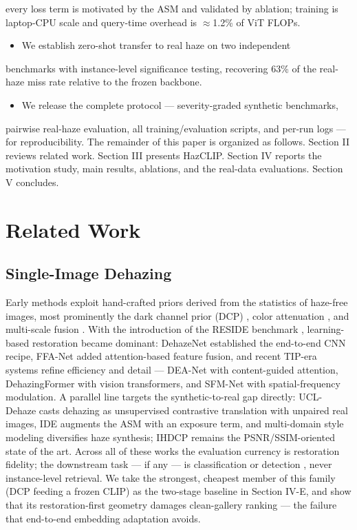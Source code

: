 \documentclass[journal]{IEEEtran}
\begin{document}
  every loss term is motivated by the ASM and validated by ablation;
  training is laptop-CPU scale and query-time overhead is $\approx$1.2\% of ViT
  FLOPs.
\begin{itemize}
\item We establish zero-shot transfer to real haze on two independent
\end{itemize}
  benchmarks with instance-level significance testing, recovering 63\% of
  the real-haze miss rate relative to the frozen backbone.
\begin{itemize}
\item We release the complete protocol --- severity-graded synthetic benchmarks,
\end{itemize}
  pairwise real-haze evaluation, all training/evaluation scripts, and
  per-run logs --- for reproducibility.
The remainder of this paper is organized as follows. Section II reviews
related work. Section III presents HazCLIP. Section IV reports the
motivation study, main results, ablations, and the real-data evaluations.
Section V concludes.

\section{Related Work}
\subsection{Single-Image Dehazing}
Early methods exploit hand-crafted priors derived from the statistics of
haze-free images, most prominently the dark channel prior (DCP)
\cite{he2010dcp}, color attenuation \cite{zhu2015fast}, and multi-scale
fusion \cite{ancuti2018ohaze}. With the introduction of the RESIDE
benchmark \cite{li2018reside}, learning-based restoration became dominant:
DehazeNet \cite{cai2016dehazenet} established the end-to-end CNN recipe,
FFA-Net \cite{qin2020ffa} added attention-based feature fusion, and recent
TIP-era systems refine efficiency and detail --- DEA-Net
\cite{chen2024deanet} with content-guided attention, DehazingFormer
\cite{song2023dehazingformer} with vision transformers, and SFM-Net
\cite{shen2025sfm} with spatial-frequency modulation. A parallel line
targets the synthetic-to-real gap directly: UCL-Dehaze \cite{wang2024ucldehaze}
casts dehazing as unsupervised contrastive translation with unpaired real
images, IDE \cite{ju2021ide} augments the ASM with an exposure term, and
multi-domain style modeling \cite{huang2026hazeasy,zhang2026dahaze}
diversifies haze synthesis; IHDCP \cite{liu2026ihdcp} remains the
PSNR/SSIM-oriented state of the art. Across all of these works the
evaluation currency is restoration fidelity; the downstream task --- if any ---
is classification or detection \cite{liu2020denoising}, never
instance-level retrieval. We take the strongest, cheapest member of this
family (DCP \cite{he2010dcp} feeding a frozen CLIP) as the two-stage
baseline in Section IV-E, and show that its restoration-first geometry
damages clean-gallery ranking --- the failure that end-to-end embedding
adaptation avoids.
\end{document}
